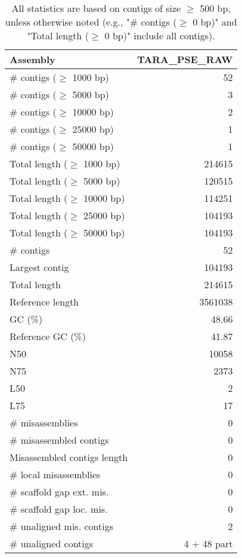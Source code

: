 \documentclass[12pt,a4paper]{article}
\begin{document}
\begin{table}[ht]
\begin{center}
\caption{All statistics are based on contigs of size $\geq$ 500 bp, unless otherwise noted (e.g., "\# contigs ($\geq$ 0 bp)" and "Total length ($\geq$ 0 bp)" include all contigs).}
\begin{tabular}{|l*{1}{|r}|}
\hline
Assembly & TARA\_PSE\_RAW \\ \hline
\# contigs ($\geq$ 1000 bp) & 52 \\ \hline
\# contigs ($\geq$ 5000 bp) & 3 \\ \hline
\# contigs ($\geq$ 10000 bp) & 2 \\ \hline
\# contigs ($\geq$ 25000 bp) & 1 \\ \hline
\# contigs ($\geq$ 50000 bp) & 1 \\ \hline
Total length ($\geq$ 1000 bp) & 214615 \\ \hline
Total length ($\geq$ 5000 bp) & 120515 \\ \hline
Total length ($\geq$ 10000 bp) & 114251 \\ \hline
Total length ($\geq$ 25000 bp) & 104193 \\ \hline
Total length ($\geq$ 50000 bp) & 104193 \\ \hline
\# contigs & 52 \\ \hline
Largest contig & 104193 \\ \hline
Total length & 214615 \\ \hline
Reference length & 3561038 \\ \hline
GC (\%) & 48.66 \\ \hline
Reference GC (\%) & 41.87 \\ \hline
N50 & 10058 \\ \hline
N75 & 2373 \\ \hline
L50 & 2 \\ \hline
L75 & 17 \\ \hline
\# misassemblies & 0 \\ \hline
\# misassembled contigs & 0 \\ \hline
Misassembled contigs length & 0 \\ \hline
\# local misassemblies & 0 \\ \hline
\# scaffold gap ext. mis. & 0 \\ \hline
\# scaffold gap loc. mis. & 0 \\ \hline
\# unaligned mis. contigs & 2 \\ \hline
\# unaligned contigs & 4 + 48 part \\ \hline

\end{tabular}
\end{center}
\end{table}
\end{document}
